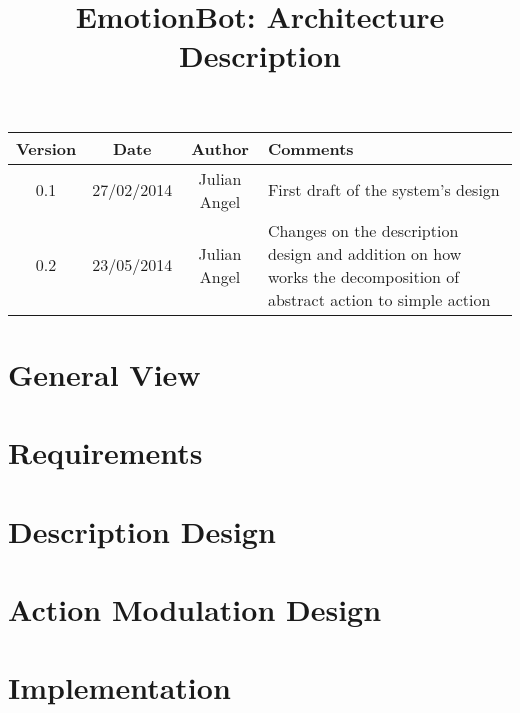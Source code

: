 \documentclass[10pt,a4paper,oneside]{book}
\begin{document}
	\title{EmotionBot: Architecture Description}
	\maketitle
	\tableofcontents
	\newpage
	\begin{center}
		\begin{tabular}{|c|c|c|p{5.5 cm}|}
		\hline
		Version & Date &Author & Comments\\
		\hline
		 0.1&27/02/2014&Julian Angel & First draft of the system's design\\
		 \hline
		 0.2&23/05/2014&Julian Angel & Changes on the description design and addition on how works the decomposition of abstract action to simple action\\
		 \hline
		\end{tabular}
	\end{center}
	\newpage
	\chapter{General View}
	
	
	
	
	\chapter{Requirements}
	
	\chapter{Description Design}
	\chapter{Action Modulation Design}
	\chapter{Implementation}
	
\end{document}
